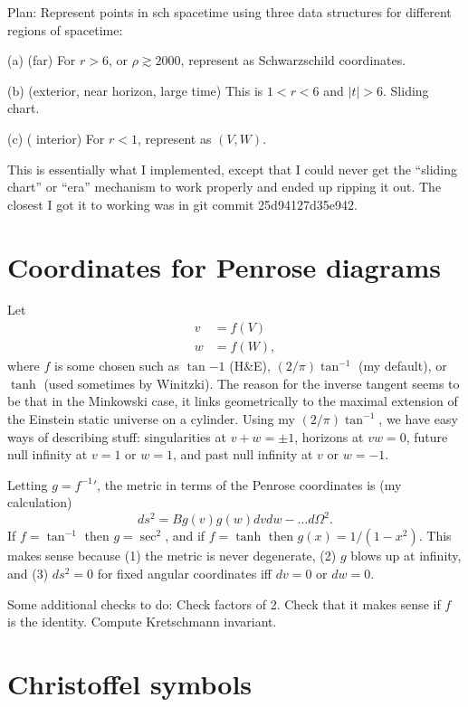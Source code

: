 \documentclass{article}
\begin{document}
Plan: Represent points in sch spacetime using three data structures for different regions of spacetime:

(a) (far) For $r>6$,
or $\rho\gtrsim 2000$, represent as Schwarzschild coordinates.

(b) (exterior, near horizon, large time) This is $1<r<6$ and $|t|>6$. Sliding chart.

(c) ( interior) For $r<1$, represent as $(V,W)$.

This is essentially what I implemented, except that I could never get the ``sliding chart''
or ``era'' mechanism to work properly and ended up ripping it out. The closest I got it to
working was in git commit 25d94127d35e942.

\section{Coordinates for Penrose diagrams}

Let
\begin{align}
  v &= f(V)\\
  w &= f(W),
\end{align}
where $f$ is some chosen such as $\tan{-1}$ (H\&E), $(2/\pi)\tan^{-1}$ (my default),
or $\tanh$ (used sometimes by Winitzki). The reason for the inverse tangent seems to be
that in the Minkowski case, it links geometrically to the maximal extension of the Einstein static universe
on a cylinder. Using my $(2/\pi)\tan^{-1}$, we have easy ways of describing stuff:
singularities at $v+w=\pm1$, horizons at $vw=0$, future null infinity at $v=1$ or $w=1$,
and past null infinity at $v$ or $w=-1$.

Letting $g={f^{-1}}'$, the metric in terms of the Penrose coordinates is (my calculation)
\begin{equation}
  ds^2 = B g(v)g(w)dvdw-\ldots d\Omega^2.
\end{equation}
If $f=\tan^{-1}$ then $g=\sec^2$,
and if $f=\tanh$ then $g(x)=1/(1-x^2)$. This makes sense because (1) the metric is never degenerate,
(2) $g$ blows up at infinity, and (3) $ds^2=0$ for fixed angular coordinates iff $dv=0$ or $dw=0$.

Some additional checks to do: 
Check factors of 2. Check that it makes sense if $f$ is the identity.
Compute Kretschmann invariant.

\section{Christoffel symbols}
\end{document}
